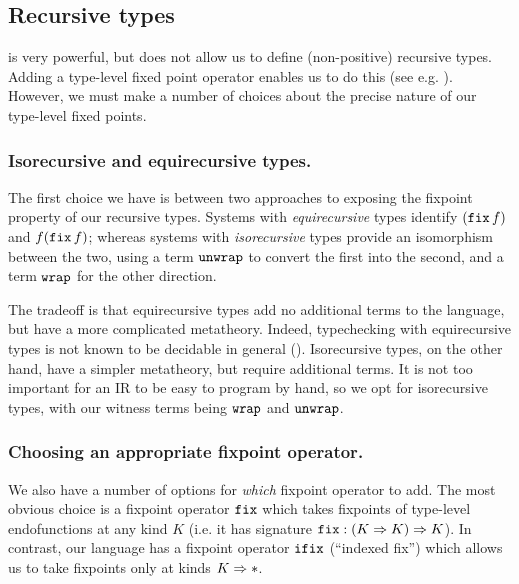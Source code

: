 \subsection{Recursive types}

\FOM{} is very powerful, but does not allow us to define (non-positive) recursive
types. Adding a type-level fixed point operator enables us to do
this (see e.g. \cite[Chapter 20]{pierce2002types}).
However, we must make a number of choices about the precise nature of our type-level fixed points. 

\subsubsection{Isorecursive and equirecursive types.}

The first choice we have is between two approaches to exposing the fixpoint
property of our recursive types.
Systems with \emph{equirecursive} types identify $(\operatorname{\texttt{fix}} f)$ and $f (\operatorname{\texttt{fix}} f)$; whereas
systems with \emph{isorecursive} types provide an isomorphism between
the two, using a term $\operatorname{\texttt{unwrap}}$ to convert the first into the second, and a term
$\operatorname{\texttt{wrap}}$ for the other direction.

The tradeoff is that equirecursive types add no additional terms to the language, but
have a more complicated metatheory. Indeed, typechecking \FOMF{} with equirecursive types is not
known to be decidable in general (\cite{dreyer:recursive-modules,cai-giarrusso-ostermann}). Isorecursive types, on the other hand,
have a simpler metatheory, but require additional terms. It is not
too important for an IR to be easy to program by hand, so we opt for
isorecursive types, with our witness terms being $\operatorname{\texttt{wrap}}$ and $\operatorname{\texttt{unwrap}}$.

\subsubsection{Choosing an appropriate fixpoint operator.}

We also have a number of options for \emph{which} fixpoint operator to add. The most obvious choice is a fixpoint
operator $\operatorname{\texttt{fix}}$ which takes fixpoints of type-level endofunctions 
at any kind $K$ (i.e. it has signature $\operatorname{\texttt{fix}} : (K \Rightarrow K) \Rightarrow
K$). In contrast, our language \FOMF{} has a fixpoint operator $\operatorname{\texttt{ifix}}$
(``indexed fix'') which allows us to
take fixpoints only at kinds $K \Rightarrow \operatorname{\ast}$. 

